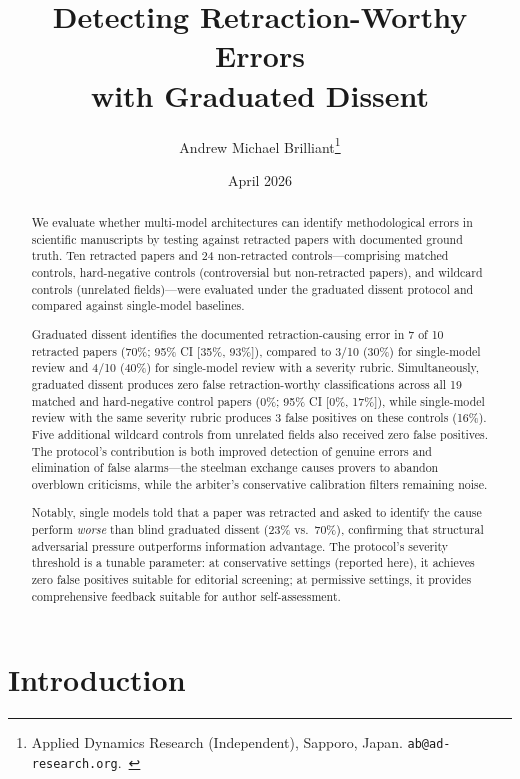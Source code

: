 \documentclass[11pt]{article}
\title{Detecting Retraction-Worthy Errors\\[0.3em]
with Graduated Dissent}
\author{Andrew Michael Brilliant\thanks{Applied Dynamics Research (Independent), Sapporo, Japan. \texttt{ab@ad-research.org}.~\orcidlink{0009-0004-8024-5442}}}
\date{April 2026}
\begin{document}
\maketitle

\begin{abstract}
We evaluate whether multi-model architectures can identify methodological errors in scientific manuscripts by testing against retracted papers with documented ground truth. Ten retracted papers and 24 non-retracted controls---comprising matched controls, hard-negative controls (controversial but non-retracted papers), and wildcard controls (unrelated fields)---were evaluated under the graduated dissent protocol and compared against single-model baselines.

Graduated dissent identifies the documented retraction-causing error in 7 of 10 retracted papers (70\%; 95\% CI [35\%, 93\%]), compared to 3/10 (30\%) for single-model review and 4/10 (40\%) for single-model review with a severity rubric. Simultaneously, graduated dissent produces zero false retraction-worthy classifications across all 19 matched and hard-negative control papers (0\%; 95\% CI [0\%, 17\%]), while single-model review with the same severity rubric produces 3 false positives on these controls (16\%). Five additional wildcard controls from unrelated fields also received zero false positives. The protocol's contribution is both improved detection of genuine errors and elimination of false alarms---the steelman exchange causes provers to abandon overblown criticisms, while the arbiter's conservative calibration filters remaining noise.

Notably, single models told that a paper was retracted and asked to identify the cause perform \emph{worse} than blind graduated dissent (23\% vs.\ 70\%), confirming that structural adversarial pressure outperforms information advantage. The protocol's severity threshold is a tunable parameter: at conservative settings (reported here), it achieves zero false positives suitable for editorial screening; at permissive settings, it provides comprehensive feedback suitable for author self-assessment.
\end{abstract}

\tableofcontents
\newpage

\section{Introduction}
\end{document}
